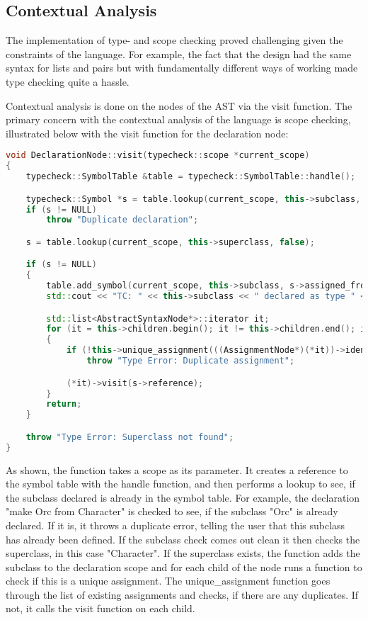 \subsection{Contextual Analysis}

The implementation of type- and scope checking proved challenging given the constraints of the language. For example, the fact that the design had the same syntax for lists and pairs but with fundamentally different ways of working made type checking quite a hassle.

Contextual analysis is done on the nodes of the AST via the visit function. The primary concern with the contextual analysis of the language is scope checking, illustrated below with the visit function for the declaration node:

\begin{lstlisting}[language = c++]
void DeclarationNode::visit(typecheck::scope *current_scope)
{
	typecheck::SymbolTable &table = typecheck::SymbolTable::handle();

	typecheck::Symbol *s = table.lookup(current_scope, this->subclass, false);
	if (s != NULL)
		throw "Duplicate declaration";

	s = table.lookup(current_scope, this->superclass, false);

	if (s != NULL)
	{
		table.add_symbol(current_scope, this->subclass, s->assigned_from, s->assigns, s->reference);
		std::cout << "TC: " << this->subclass << " declared as type " << this->superclass << std::endl;

		std::list<AbstractSyntaxNode*>::iterator it;
		for (it = this->children.begin(); it != this->children.end(); it++)
		{
			if (!this->unique_assignment(((AssignmentNode*)(*it))->identifier))
				throw "Type Error: Duplicate assignment";

			(*it)->visit(s->reference);
		}
		return;
	}

	throw "Type Error: Superclass not found";
}
\end{lstlisting}

As shown, the function takes a scope as its parameter. It creates a reference to the symbol table with the handle function, and then performs a lookup to see, if the subclass declared is already in the symbol table. For example, the declaration "make Orc from Character" is checked to see, if the subclass "Orc" is already declared. If it is, it throws a duplicate error, telling the user that this subclass has already been defined. If the subclass check comes out clean it then checks the superclass, in this case "Character". If the superclass exists, the function adds the subclass to the declaration scope and for each child of the node runs a function to check if this is a unique assignment. The unique\_assignment function goes through the list of existing assignments and checks, if there are any duplicates. If not, it calls the visit function on each child.


